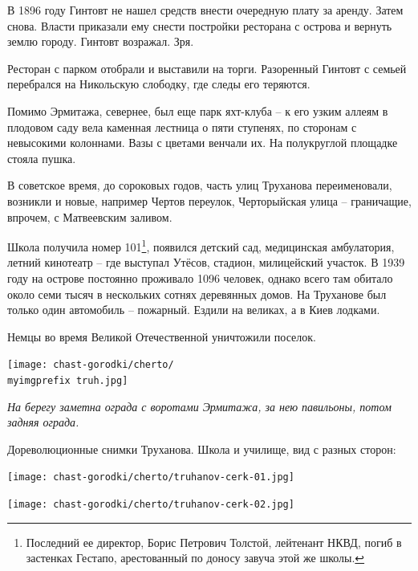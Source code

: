 В 1896 году Гинтовт не нашел средств внести очередную плату за аренду. Затем снова. Власти приказали ему снести постройки ресторана с острова и вернуть землю городу. Гинтовт возражал. Зря.

Ресторан с парком отобрали и выставили на торги.  Разоренный Гинтовт с семьей перебрался на Никольскую слободку, где следы его теряются.

Помимо Эрмитажа, севернее, был еще парк яхт-клуба – к его узким аллеям в плодовом саду вела каменная лестница о пяти ступенях, по сторонам с невысокими колоннами. Вазы с цветами венчали их. На полукруглой площадке стояла пушка.

В советское время, до сороковых годов, часть улиц Труханова переименовали, возникли и новые, например Чертов переулок, Черторыйская улица – граничащие, впрочем, с Матвеевским заливом.

Школа получила номер 101\footnote{Последний ее директор, Борис Петрович Толстой, лейтенант НКВД, погиб в застенках Гестапо, арестованный по доносу завуча этой же школы.}, появился детский сад, медицинская амбулатория, летний кинотеатр – где выступал Утёсов, стадион, милицейский участок. В 1939 году на острове постоянно проживало 1096 человек, однако всего там обитало около семи тысяч в нескольких сотнях деревянных домов. На Труханове был только один автомобиль – пожарный. Ездили на великах, а в Киев лодками.

Немцы во время Великой Отечественной уничтожили поселок.
\vspace*{\fill}
\begin{center}
\texttt{[image: chast-gorodki/cherto/\\myimgprefix truh.jpg]}

\textit{На берегу заметна ограда с воротами Эрмитажа, за нею павильоны, потом задняя ограда.}
\end{center}
\vspace*{\fill}
\newpage
\vspace*{\fill}

Дореволюционные снимки Труханова. Школа и училище, вид с разных сторон:

\begin{center}
\texttt{[image: chast-gorodki/cherto/truhanov-сerk-01.jpg]}
\end{center}

\begin{center}
\texttt{[image: chast-gorodki/cherto/truhanov-сerk-02.jpg]}
\end{center}

